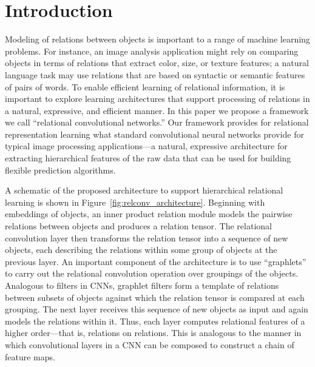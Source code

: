 \section{Introduction}\label{sec:intro}

Modeling of relations between objects is important to a range of machine learning problems. For instance, an image analysis application might rely on comparing objects in terms of relations that extract color, size, or texture features; a natural language task may use relations that are based on syntactic or semantic features of pairs of words. To enable efficient learning of relational information, it is important to explore learning architectures that support processing of relations in a natural, expressive, and efficient manner. In this paper we propose a framework we call ``relational convolutional networks.'' Our framework provides for relational representation learning what standard convolutional neural networks provide for typical image processing applications---a natural, expressive architecture for extracting hierarchical features of the raw data that can be used for building flexible prediction algorithms.

A schematic of the proposed architecture to support hierarchical relational learning is shown in Figure~\ref{fig:relconv_architecture}. Beginning with embeddings of objects, an inner product relation module models the pairwise relations between objects and produces a relation tensor. The relational convolution layer then transforms the relation tensor into a sequence of new objects, each describing the relations within some group of objects at the previous layer.  An important component of the architecture is to use ``graphlets'' to carry out the relational convolution operation over groupings of the objects. Analogous to filters in CNNs, graphlet filters form a template of relations between subsets of objects against which the relation tensor is compared at each grouping. The next layer receives this sequence of new objects as input and again models the relations within it. Thus, each layer computes relational features of a higher order---that is, relations on relations. This is analogous to the manner in which convolutional layers in a CNN can be composed to construct a chain of feature maps.

